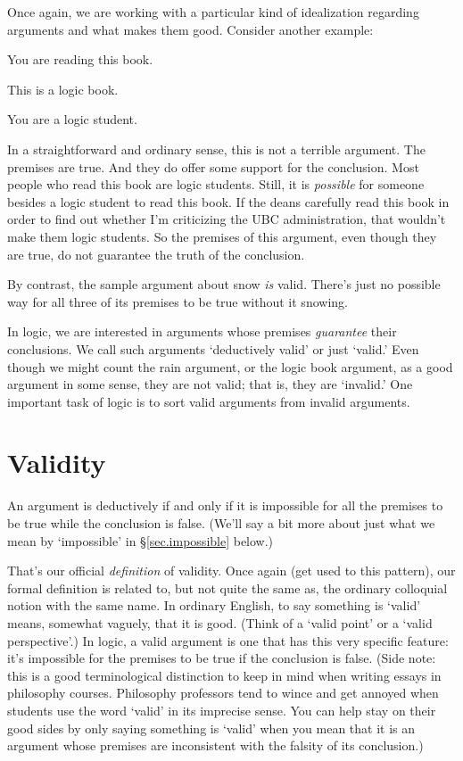 Once again, we are working with a particular kind of idealization regarding arguments and what makes them good. Consider another example:
\begin{earg}
\item[] You are reading this book.
\item[] This is a logic book.
\item[\therefore] You are a logic student.
\end{earg}
In a straightforward and ordinary sense, this is not a terrible argument. The premises are true. And they do offer some support for the conclusion. Most people who read this book are logic students. Still, it is \emph{possible} for someone besides a logic student to read this book. If the deans carefully read this book in order to find out whether I'm criticizing the UBC administration, that wouldn't make them logic students. So the premises of this argument, even though they are true, do not guarantee the truth of the conclusion.

By contrast, the sample argument about snow \emph{is} valid. There's just no possible way for all three of its premises to be true without it snowing.

In logic, we are interested in arguments whose premises \emph{guarantee} their conclusions. We call such arguments `deductively valid' or just `valid.' Even though we might count the rain argument, or the logic book argument, as a good argument in some sense, they are not valid; that is, they are `invalid.' One important task of logic is to sort valid arguments from invalid arguments.

\section{Validity}
\label{sec:validity}
An argument is deductively  if and only if it is impossible for all the premises to be true while the conclusion is false. (We'll say a bit more about just what we mean by `impossible' in \S\ref{sec.impossible} below.)

That's our official \emph{definition} of validity. Once again (get used to this pattern), our formal definition is related to, but not quite the same as, the ordinary colloquial notion with the same name. In ordinary English, to say something is `valid' means, somewhat vaguely, that it is good. (Think of a `valid point' or a `valid perspective'.) In logic, a valid argument is one that has this very specific feature: it's impossible for the premises to be true if the conclusion is false. (Side note: this is a good terminological distinction to keep in mind when writing essays in philosophy courses. Philosophy professors tend to wince and get annoyed when students use the word `valid' in its imprecise sense. You can help stay on their good sides by only saying something is `valid' when you mean that it is an argument whose premises are inconsistent with the falsity of its conclusion.)

